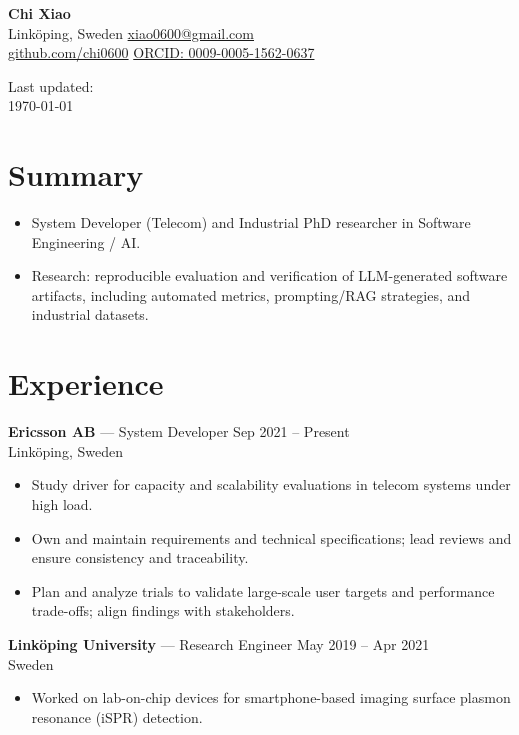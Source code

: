 \documentclass[11pt,a4paper]{article}
\begin{document}
\begin{minipage}[t]{0.72\textwidth}
{\LARGE \textbf{Chi Xiao}}\\
Linköping, Sweden \quad \href{mailto:xiao0600@gmail.com}{xiao0600@gmail.com}\\
\href{https://github.com/chi0600}{github.com/chi0600} \quad
\href{https://orcid.org/0009-0005-1562-0637}{ORCID: 0009-0005-1562-0637}
\end{minipage}
\hfill
\begin{minipage}[t]{0.25\textwidth}
\raggedleft
Last updated:\\
\today
\end{minipage}

\section*{Summary}
\begin{itemize}
  \item System Developer (Telecom) and Industrial PhD researcher in Software Engineering / AI.
  \item Research: reproducible evaluation and verification of LLM-generated software artifacts, including automated metrics, prompting/RAG strategies, and industrial datasets.
\end{itemize}

\section*{Experience}
\textbf{Ericsson AB} — System Developer \hfill Sep 2021 -- Present \\
Linköping, Sweden
\begin{itemize}
  \item Study driver for capacity and scalability evaluations in telecom systems under high load.
  \item Own and maintain requirements and technical specifications; lead reviews and ensure consistency and traceability.
  \item Plan and analyze trials to validate large-scale user targets and performance trade-offs; align findings with stakeholders.
\end{itemize}

\textbf{Linköping University} — Research Engineer \hfill May 2019 -- Apr 2021 \\
Sweden
\begin{itemize}
  \item Worked on lab-on-chip devices for smartphone-based imaging surface plasmon resonance (iSPR) detection.
\end{itemize}
\end{document}
